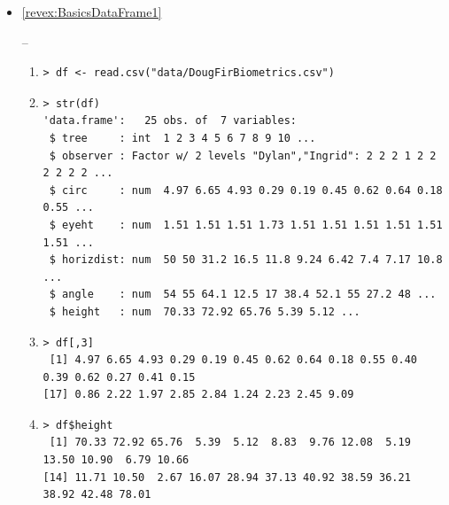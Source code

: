 \documentclass[10pt,openany]{book}\usepackage[]{graphicx}\usepackage[]{color}
\makeatletter
\newenvironment{kframe}{%
 \def\at@end@of@kframe{}%
 \ifinner\ifhmode%
  \def\at@end@of@kframe{\end{minipage}}%
  \begin{minipage}{\columnwidth}%
 \fi\fi%
 \def\FrameCommand##1{\hskip\@totalleftmargin \hskip-\fboxsep
 \colorbox{shadecolor}{##1}\hskip-\fboxsep
     \hskip-\linewidth \hskip-\@totalleftmargin \hskip\columnwidth}%
 \MakeFramed {\advance\hsize-\width
   \@totalleftmargin\z@ \linewidth\hsize
   \@setminipage}}%
 {\par\unskip\endMakeFramed%
 \at@end@of@kframe}
\newenvironment{knitrout}{}{} %
\makeatother
\begin{document}
\begin{itemize}
  \item \hypertarget{ans:BasicsDataFrame1}{\ref{revex:BasicsDataFrame1}} --
    \begin{enumerate}
      \item
\begin{knitrout}
\color{fgcolor}\begin{kframe}
\begin{verbatim}
> df <- read.csv("data/DougFirBiometrics.csv")
\end{verbatim}
\end{kframe}
\end{knitrout}
      \item
\begin{knitrout}
\color{fgcolor}\begin{kframe}
\begin{verbatim}
> str(df)
'data.frame':	25 obs. of  7 variables:
 $ tree     : int  1 2 3 4 5 6 7 8 9 10 ...
 $ observer : Factor w/ 2 levels "Dylan","Ingrid": 2 2 2 1 2 2 2 2 2 2 ...
 $ circ     : num  4.97 6.65 4.93 0.29 0.19 0.45 0.62 0.64 0.18 0.55 ...
 $ eyeht    : num  1.51 1.51 1.51 1.73 1.51 1.51 1.51 1.51 1.51 1.51 ...
 $ horizdist: num  50 50 31.2 16.5 11.8 9.24 6.42 7.4 7.17 10.8 ...
 $ angle    : num  54 55 64.1 12.5 17 38.4 52.1 55 27.2 48 ...
 $ height   : num  70.33 72.92 65.76 5.39 5.12 ...
\end{verbatim}
\end{kframe}
\end{knitrout}
      \item
\begin{knitrout}
\color{fgcolor}\begin{kframe}
\begin{verbatim}
> df[,3]
 [1] 4.97 6.65 4.93 0.29 0.19 0.45 0.62 0.64 0.18 0.55 0.40 0.39 0.62 0.27 0.41 0.15
[17] 0.86 2.22 1.97 2.85 2.84 1.24 2.23 2.45 9.09
\end{verbatim}
\end{kframe}
\end{knitrout}
      \item
\begin{knitrout}
\color{fgcolor}\begin{kframe}
\begin{verbatim}
> df$height
 [1] 70.33 72.92 65.76  5.39  5.12  8.83  9.76 12.08  5.19 13.50 10.90  6.79 10.66
[14] 11.71 10.50  2.67 16.07 28.94 37.13 40.92 38.59 36.21 38.92 42.48 78.01

\end{verbatim}
\end{kframe}
\end{knitrout}
\end{enumerate}
\end{itemize}
\end{document}
